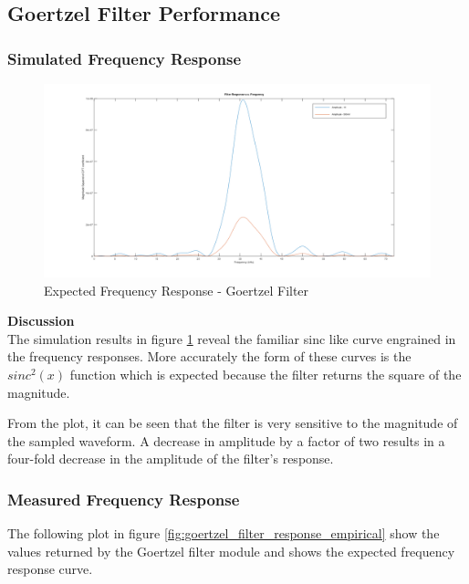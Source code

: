 \subsection{Goertzel Filter Performance}

\subsubsection{Simulated Frequency Response}
\label{sec:results_frequency_response}

\begin{figure}[H]
	\centering
	\includegraphics[width=\linewidth]{figures/results/goertzel_filter_simulation_wide.png}
	\caption{Expected Frequency Response - Goertzel Filter}
	\label{fig:goertzel_filter_response_simulated}
\end{figure}



\textbf{Discussion}\\
The simulation results in figure \ref{fig:goertzel_filter_response_simulated} reveal the familiar sinc like curve engrained in the frequency responses. More accurately the form of these curves is the $sinc^2(x)$ function which is expected because the filter returns the square of the magnitude.

From the plot, it can be seen that the filter is very sensitive to the magnitude of the sampled waveform. A decrease in amplitude by a factor of two results in a four-fold decrease in the amplitude of the filter's response.




\subsubsection{Measured Frequency Response}

The following plot in figure \ref{fig:goertzel_filter_response_empirical} show the values returned by the Goertzel filter module and shows the expected frequency response curve.


